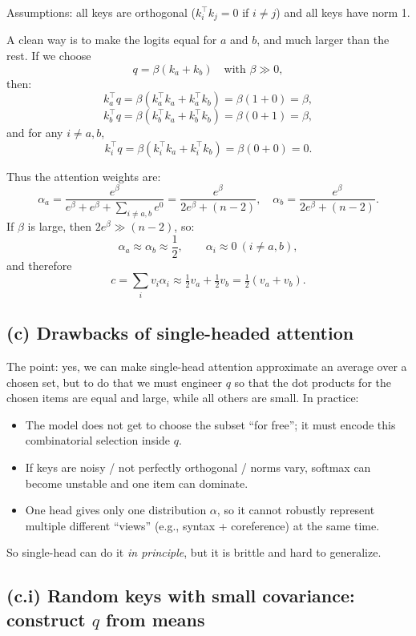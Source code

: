 \documentclass[11pt]{article}
\begin{document}
Assumptions: all keys are orthogonal ($k_i^\top k_j=0$ if $i\neq j$) and all keys have norm 1.

A clean way is to make the logits equal for $a$ and $b$, and much larger than the rest. If we choose
\[
q=\beta(k_a+k_b) \quad \text{with } \beta\gg 0,
\]
then:
\[
k_a^\top q = \beta(k_a^\top k_a + k_a^\top k_b)=\beta(1+0)=\beta,
\]
\[
k_b^\top q = \beta(k_b^\top k_a + k_b^\top k_b)=\beta(0+1)=\beta,
\]
and for any $i\neq a,b$,
\[
k_i^\top q = \beta(k_i^\top k_a + k_i^\top k_b)=\beta(0+0)=0.
\]

Thus the attention weights are:
\[
\alpha_a=\frac{e^{\beta}}{e^{\beta}+e^{\beta}+\sum_{i\neq a,b} e^{0}}
=\frac{e^{\beta}}{2e^{\beta}+(n-2)},
\quad
\alpha_b=\frac{e^{\beta}}{2e^{\beta}+(n-2)}.
\]
If $\beta$ is large, then $2e^\beta \gg (n-2)$, so:
\[
\alpha_a\approx \alpha_b\approx \frac{1}{2}, \qquad \alpha_i\approx 0 \ (i\neq a,b),
\]
and therefore
\[
c=\sum_i v_i\alpha_i \approx \tfrac{1}{2}v_a+\tfrac{1}{2}v_b=\tfrac{1}{2}(v_a+v_b).
\]

\subsection*{(c) Drawbacks of single-headed attention}

The point: yes, we can make single-head attention approximate an average over a chosen set, but to do that we must engineer $q$ so that the dot products for the chosen items are equal and large, while all others are small. In practice:
\begin{itemize}[leftmargin=18pt]
  \item The model does not get to choose the subset ``for free''; it must encode this combinatorial selection inside $q$.
  \item If keys are noisy / not perfectly orthogonal / norms vary, softmax can become unstable and one item can dominate.
  \item One head gives only one distribution $\alpha$, so it cannot robustly represent multiple different ``views'' (e.g., syntax + coreference) at the same time.
\end{itemize}
So single-head can do it \emph{in principle}, but it is brittle and hard to generalize.

\subsection*{(c.i) Random keys with small covariance: construct $q$ from means}
\end{document}
